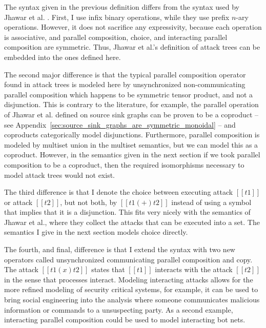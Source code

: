 \documentclass{llncs}
\begin{document}
The syntax given in the previous definition differs from the syntax
used by Jhawar et al. \cite{Jhawar:2015}.  First, I use infix binary
operations, while they use prefix $n$-ary operations. However, it does
not sacrifice any expressivity, because each operation is associative,
and parallel composition, choice, and interacting parallel composition
are symmetric.  Thus, Jhawar et al.'s definition of attack trees can
be embedded into the ones defined here.%

The second major difference is that the typical parallel composition
operator found in attack trees is modeled here by unsynchronized
non-communicating parallel composition which happens to be symmetric
tensor product, and not a disjunction.  This is contrary to the
literature, for example, the parallel operation of Jhawar et
al. defined on source sink graphs \cite{Jhawar:2015} can be proven to
be a coproduct -- see
Appendix~\ref{sec:source_sink_graphs_are_symmetric_monoidal} -- and
coproducts categorically model disjunctions.  Furthermore, parallel
composition is modeled by multiset union in the multiset semantics,
but we can model this as a coproduct.  However, in the semantics given
in the next section if we took parallel composition to be a coproduct,
then the required isomorphisms necessary to model attack trees would
not exist.

The third difference is that I denote the choice between executing
attack $[[t1]]$ or attack $[[t2]]$, but not both, by $[[t1 (+) t2]]$
instead of using a symbol that implies that it is a disjunction.  This
fits very nicely with the semantics of Jhawar et al., where they
collect the attacks that can be executed into a set.  The semantics I
give in the next section models choice directly.

The fourth, and final, difference is that I extend the syntax with two
new operators called unsynchronized communicating parallel composition
and copy.  The attack $[[t1 (x) t2]]$ states that $[[t1]]$ interacts
with the attack $[[t2]]$ in the sense that processes interact.
Modeling interacting attacks allows for the more refined modeling of
security critical systems, for example, it can be used to bring social
engineering into the analysis where someone communicates malicious
information or commands to a unsuspecting party.  As a second example,
interacting parallel composition could be used to model interacting
bot nets.
\end{document}
